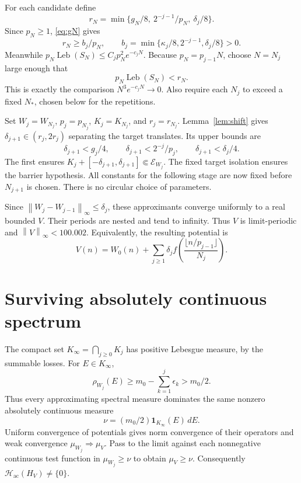 \documentclass[11pt,a4paper]{article}
\numberwithin{equation}{section}
\theoremstyle{remark}
\newcommand{\Leb}{\operatorname{Leb}}
\newcommand{\dd}{\,d}
\newcommand{\norm}[1]{\left\lVert #1\right\rVert}
\begin{document}
For each candidate define
\begin{equation}\label{eq:radius}
r_N=\min\{g_N/8,\ 2^{-j-1}/p_N,\ \delta_j/8\}.
\end{equation}
Since $p_N\ge1$, \eqref{eq:gN} gives
\[
r_N\ge b_j/p_N,\qquad
b_j=\min\{\kappa_j/8,2^{-j-1},\delta_j/8\}>0.
\]
Meanwhile $p_N\Leb(S_N)\le C_jp_N^2e^{-c_jN}$.
Because $p_N=p_{j-1}N$, choose $N=N_j$ large enough
that
\begin{equation}\label{eq:compatibility}
p_N\Leb(S_N)<r_N.
\end{equation}
This is exactly the comparison $N^3e^{-c_jN}\to0$.
Also require each $N_j$ to exceed a fixed $N_*$, chosen
below for the repetitions.

Set $W_j=W_{N_j}$, $p_j=p_{N_j}$, $K_j=K_{N_j}$,
and $r_j=r_{N_j}$. Lemma~\ref{lem:shift} gives
$\delta_{j+1}\in(r_j,2r_j)$ separating the target
translates. Its upper bounds are
\begin{equation}\label{eq:deltabounds}
\delta_{j+1}<g_j/4,\qquad
\delta_{j+1}<2^{-j}/p_j,\qquad
\delta_{j+1}<\delta_j/4.
\end{equation}
The first ensures
$K_j+[-\delta_{j+1},\delta_{j+1}]\Subset\mathcal E_{W_j}$.
The fixed target isolation ensures the barrier hypothesis.
All constants for the following stage are now fixed
before $N_{j+1}$ is chosen. There is no circular
choice of parameters.

Since $\norm{W_j-W_{j-1}}_\infty\le\delta_j$, these
approximants converge uniformly to a real bounded $V$.
Their periods are nested and tend to infinity.
Thus $V$ is limit-periodic and $\norm{V}_\infty<100.002$.
Equivalently, the resulting potential is
\[
V(n)=W_0(n)+\sum_{j\ge1}\delta_j
f\left(\frac{\lfloor n/p_{j-1}\rfloor}{N_j}\right).
\]

\section{Surviving absolutely continuous spectrum}
The compact set $K_\infty=\bigcap_{j\ge0}K_j$ has
positive Lebesgue measure, by the summable losses.
For $E\in K_\infty$,
\[
\rho_{W_j}(E)\ge m_0-\sum_{k=1}^j\epsilon_k>m_0/2.
\]
Thus every approximating spectral measure dominates
the same nonzero absolutely continuous measure
\[
\nu=(m_0/2)\mathbf1_{K_\infty}(E)\dd E.
\]
Uniform convergence of potentials gives norm convergence
of their operators and weak convergence
$\mu_{W_j}\Rightarrow\mu_V$. Pass to the limit against
each nonnegative continuous test function in
$\mu_{W_j}\ge\nu$ to obtain $\mu_V\ge\nu$.
Consequently $\mathcal H_{\mathrm{ac}}(H_V)\ne\{0\}$.
\end{document}
